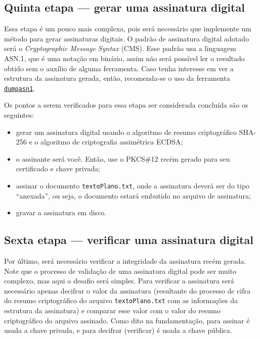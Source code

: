 \documentclass{article}
\begin{document}
\subsection{Quinta etapa --- gerar uma assinatura digital}\label{subsec:step5}

Essa etapa é um pouco mais complexa, pois será necessário que implemente um
método para gerar assinaturas digitais. O padrão de assinatura digital adotado
será o \textit{Cryptographic Message Syntax} (CMS). Esse padrão usa a linguagem
ASN.1, que é uma notação em binário, assim não será possível ler o resultado
obtido sem o auxílio de alguma ferramenta. Caso tenha interesse em ver a
estrutura da assinatura gerada, então, recomenda-se o uso da ferramenta
\texttt{\href{https://www.cs.auckland.ac.nz/~pgut001/dumpasn1.c}{dumpasn1}}.

Os pontos a serem verificados para essa etapa ser considerada concluída são os
seguintes:

\begin{itemize}
  \item gerar um assinatura digital usando o algoritmo de resumo criptográfico
      SHA-256 e o algoritmo de criptografia assimétrica ECDSA\@;
  \item o assinante será você. Então, use o PKCS\#12 recém gerado para seu
      certificado e chave privada;
  \item assinar o documento \texttt{textoPlano.txt}, onde a assinatura deverá
      ser do tipo ``anexada'', ou seja, o documento estará embutido no arquivo
        de assinatura;
  \item gravar a assinatura em disco.
\end{itemize}

\subsection{Sexta etapa ---
    verificar uma assinatura digital}\label{subsec:step6}

Por último, será necessário verificar a integridade da assinatura recém gerada.
Note que o processo de validação de uma assinatura digital pode ser muito
complexo, mas aqui o desafio será simples. Para verificar a assinatura será
necessário apenas decifrar o valor da assinatura (resultante do processo de
cifra do resumo criptográfico do arquivo \texttt{textoPlano.txt} com as
informações da estrutura da assinatura) e comparar esse valor com o valor do
resumo criptográfico do arquivo assinado. Como dito na fundamentação, para
assinar é usada a chave privada, e para decifrar (verificar) é usada a chave
pública.
\end{document}
